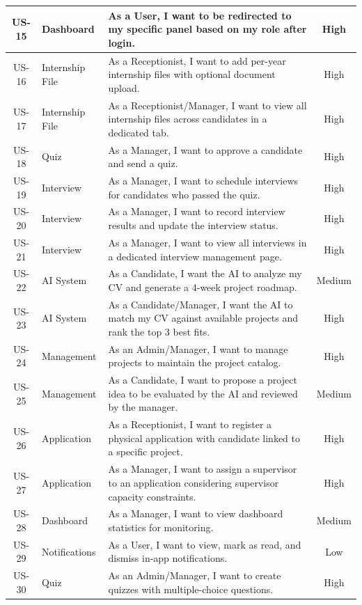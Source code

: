 \begin{longtable}{|c|p{2.5cm}|p{8cm}|c|}
\hline
US-15 & Dashboard & As a User, I want to be redirected to my specific panel based on my role after login. & High \\
\hline
US-16 & Internship File & As a Receptionist, I want to add per-year internship files with optional document upload. & High \\
\hline
US-17 & Internship File & As a Receptionist/Manager, I want to view all internship files across candidates in a dedicated tab. & High \\
\hline
US-18 & Quiz & As a Manager, I want to approve a candidate and send a quiz. & High \\
\hline
US-19 & Interview & As a Manager, I want to schedule interviews for candidates who passed the quiz. & High \\
\hline
US-20 & Interview & As a Manager, I want to record interview results and update the interview status. & High \\
\hline
US-21 & Interview & As a Manager, I want to view all interviews in a dedicated interview management page. & High \\
\hline
US-22 & AI System & As a Candidate, I want the AI to analyze my CV and generate a 4-week project roadmap. & Medium \\
\hline
US-23 & AI System & As a Candidate/Manager, I want the AI to match my CV against available projects and rank the top 3 best fits. & High \\
\hline
US-24 & Management & As an Admin/Manager, I want to manage projects to maintain the project catalog. & High \\
\hline
US-25 & Management & As a Candidate, I want to propose a project idea to be evaluated by the AI and reviewed by the manager. & Medium \\
\hline
US-26 & Application & As a Receptionist, I want to register a physical application with candidate linked to a specific project. & High \\
\hline
US-27 & Application & As a Manager, I want to assign a supervisor to an application considering supervisor capacity constraints. & High \\
\hline
US-28 & Dashboard & As a Manager, I want to view dashboard statistics for monitoring. & Medium \\
\hline
US-29 & Notifications & As a User, I want to view, mark as read, and dismiss in-app notifications. & Low \\
\hline
US-30 & Quiz & As an Admin/Manager, I want to create quizzes with multiple-choice questions. & High \\

\end{longtable}
